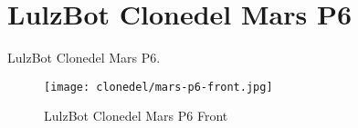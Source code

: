 %
%
%
%
%

\section{LulzBot Clonedel Mars P6}
LulzBot Clonedel Mars P6.

\begin{figure}[h!]
\texttt{[image: clonedel/mars-p6-front.jpg]}
 \caption{LulzBot Clonedel Mars P6 Front}
 \label{fig:clonedel-mars-p6-front}
\end{figure}


